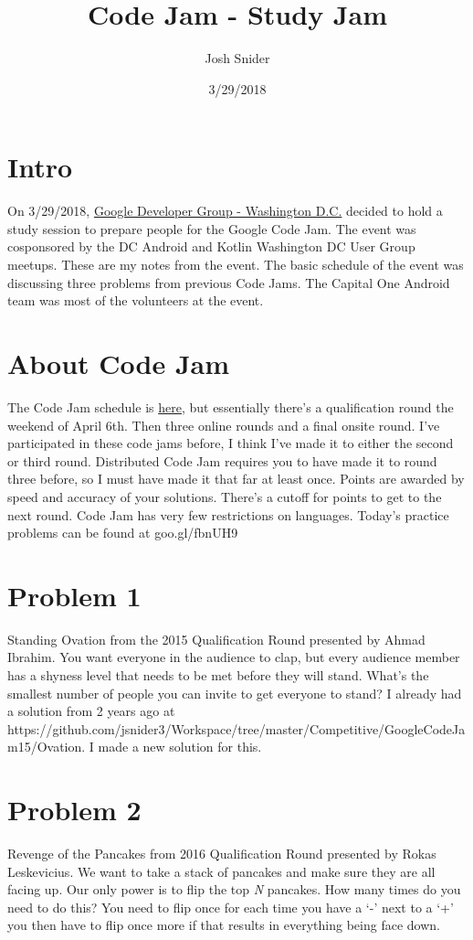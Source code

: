 \documentclass[11pt]{article} %
\title{Code Jam - Study Jam}
\author{Josh Snider}
\date{3/29/2018}
\begin{document}
\maketitle

\section*{Intro}

On 3/29/2018, \href{https://www.meetup.com/gdg-dc/}{Google Developer Group - Washington D.C.} decided to hold a study session to prepare people for the Google Code Jam. The event was cosponsored by the DC Android and Kotlin Washington DC User Group meetups. These are my notes from the event. The basic schedule of the event was discussing three problems from previous Code Jams. The Capital One Android team was most of the volunteers at the event.

\section*{About Code Jam}
The Code Jam schedule is \href{https://code.google.com/codejam/schedule}{here}, but essentially there's a qualification round the weekend of April 6th. Then three online rounds and a final onsite round. I've participated in these code jams before, I think I've made it to either the second or third round. Distributed Code Jam requires you to have made it to round three before, so I must have made it that far at least once. Points are awarded by speed and accuracy of your solutions. There's a cutoff for points to get to the next round. Code Jam has very few restrictions on languages. Today's practice problems can be found at goo.gl/fbnUH9

\section*{Problem 1}
Standing Ovation from the 2015 Qualification Round presented by Ahmad Ibrahim. You want everyone in the audience to clap, but every audience member has a shyness level that needs to be met before they will stand. What's the smallest number of people you can invite to get everyone to stand? I already had a solution from 2 years ago at https://github.com/jsnider3/Workspace/tree/master/Competitive/GoogleCodeJam15/Ovation. I made a new solution for this.

\section*{Problem 2}
Revenge of the Pancakes from 2016 Qualification Round presented by Rokas Leskevicius. We want to take a stack of pancakes and make sure they are all facing up. Our only power is to flip the top \textit{N} pancakes. How many times do you need to do this? You need to flip once for each time you have a `-' next to a `+' you then have to flip once more if that results in everything being face down.
\end{document}
